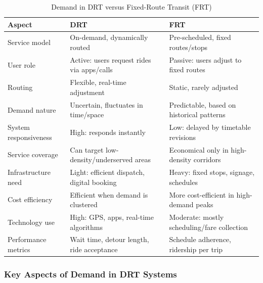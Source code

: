 \documentclass[12pt]{article}
\begin{document}
\begin{table}[H]
\centering
\caption{Demand in DRT versus Fixed-Route Transit (FRT)}
\label{tab:drt-vs-frt}
\small
\begin{tabular}{p{3cm}p{5.5cm}p{5.5cm}}
\toprule
\textbf{Aspect} & \textbf{DRT} & \textbf{FRT} \\
\midrule
Service model & On-demand, dynamically routed & Pre-scheduled, fixed routes/stops \\
User role & Active: users request rides via apps/calls & Passive: users adjust to fixed routes \\
Routing & Flexible, real-time adjustment & Static, rarely adjusted \\
Demand nature & Uncertain, fluctuates in time/space & Predictable, based on historical patterns \\
System responsiveness & High: responds instantly & Low: delayed by timetable revisions \\
Service coverage & Can target low-density/underserved areas & Economical only in high-density corridors \\
Infrastructure need & Light: efficient dispatch, digital booking & Heavy: fixed stops, signage, schedules \\
Cost efficiency & Efficient when demand is clustered & More cost-efficient in high-demand peaks \\
Technology use & High: GPS, apps, real-time algorithms & Moderate: mostly scheduling/fare collection \\
Performance metrics & Wait time, detour length, ride acceptance & Schedule adherence, ridership per trip \\
\bottomrule
\end{tabular}
\end{table}

\subsubsection{Key Aspects of Demand in DRT Systems}
\end{document}
